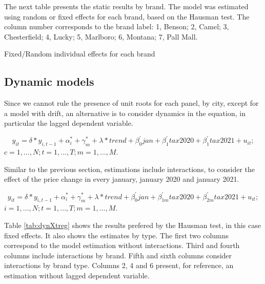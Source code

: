 \documentclass[]{article}
\begin{document}
The next table presents the static results by brand. The model was estimated using random or fixed effects for each brand, based on the Hausman test. The column number corresponds to the brand label: 1, Benson; 2, Camel; 3, Chesterfield; 4, Lucky; 5, Marlboro; 6, Montana; 7, Pall Mall.

\begin{landscape}
	\begin{table}[ht]
		\centering
		\caption{Fixed/Random individual effects for each brand \label{tab:staticXtregMarcas}} 
	
	\end{table}
\end{landscape}
 
\subsection{Dynamic models}
Since we cannot rule the presence of unit roots for each panel, by city, except for a model with drift, an alternative is to consider dynamics in the equation, in particular the lagged dependent variable. 

\begin{equation*} 
	y_{it}  = \delta*y_{i,t-1} + \alpha_{i}^{*} + \gamma_{m}^{*} + \lambda*trend + \beta_{0}^{'}jan + \beta_{1}^{'}tax2020 + \beta_{1}^{'}tax2021 + u_{it}
	;   \tag{4.3}
\end{equation*}
$c  = 1,\ldots,N;  t=1,\ldots,T; m=1,\ldots,M. $

Similar to the previous section, estimations include interactions, to consider the effect of the price change in every january, january 2020 and january 2021.

\begin{equation*} 
	y_{it}  = \delta*y_{i,t-1} +\alpha_{i}^{*} + \gamma_{m}^{*} + \lambda*trend + \beta_{0}^{'}jan + \beta_{1m}^{'}tax2020 + \beta_{2m}^{'}tax2021 + u_{it}
	;   \tag{4.4}
\end{equation*}
$i  = 1,\ldots,N;  t=1,\ldots,T; m=1,\ldots,M. $

Table \ref{tab:dynXtreg} shows the results prefered by the Hausman test, in this case fixed effects. It  also shows the estimates by type. The first two columns correspond to the model estimation without interactions. Third and fourth columns include interactions by brand. Fifth and sixth columns consider interactions by brand type.
Columns 2, 4 and 6 present, for reference, an estimation without lagged dependent variable. 
\end{document}

